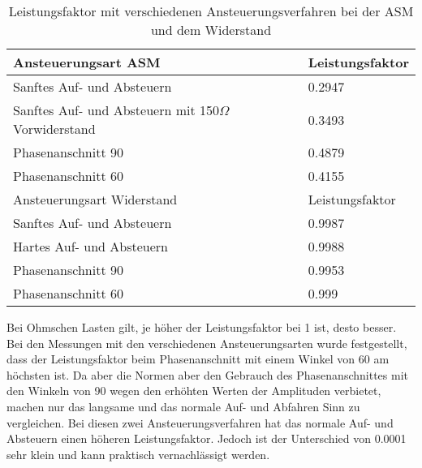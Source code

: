 \begin{table}[ht!]
	\centering
	\begin{tabular}{|l|l|}
		\hline
		Ansteuerungsart ASM                                   		& Leistungsfaktor \\ \hline 
		Sanftes Auf- und Absteuern                          		& 0.2947          \\ \hline
		Sanftes Auf- und Absteuern mit 150$\Omega$ Vorwiderstand 	& 0.3493          \\ \hline
		Phasenanschnitt 90\textdegree                               & 0.4879          \\ \hline
		Phasenanschnitt 60\textdegree                               & 0.4155          \\ \hline \hline
		Ansteuerungsart Widerstand                            		& Leistungsfaktor \\ \hline 
		Sanftes Auf- und Absteuern                          		& 0.9987          \\ \hline
		Hartes Auf- und Absteuern                                   & 0.9988          \\ \hline
		Phasenanschnitt 90\textdegree                         		& 0.9953          \\ \hline
		Phasenanschnitt 60\textdegree                         		& 0.999           \\ \hline
	\end{tabular}
\caption{Leistungsfaktor mit verschiedenen Ansteuerungsverfahren bei der ASM und dem Widerstand}\label{tab:Leistungsfaktor_ASM_Widerstand}
\end{table}
Bei Ohmschen Lasten gilt, je höher der Leistungsfaktor bei 1 ist, desto besser. Bei den Messungen mit den verschiedenen Ansteuerungsarten wurde festgestellt, dass der Leistungsfaktor beim Phasenanschnitt mit einem Winkel von 60\textdegree \hspace{0.02cm} am höchsten ist. Da aber die Normen aber den Gebrauch des Phasenanschnittes mit den Winkeln von 90\textdegree \hspace{0.02cm} wegen den erhöhten Werten der Amplituden verbietet, machen nur das langsame und das normale Auf- und Abfahren Sinn zu vergleichen. Bei diesen zwei Ansteuerungsverfahren hat das normale Auf- und Absteuern einen höheren Leistungsfaktor. Jedoch ist der Unterschied von 0.0001 sehr klein und kann praktisch vernachlässigt werden.
 
